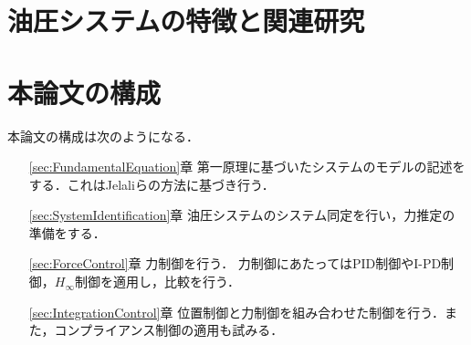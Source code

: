 \section{油圧システムの特徴と関連研究}

\section{本論文の構成}
本論文の構成は次のようになる．
\begin{itemize}
    \item [\ref{sec:FundamentalEquation}章]第一原理に基づいたシステムのモデルの記述をする．これはJelaliらの方法\cite{jelali2012hydraulic}に基づき行う．
    \item [\ref{sec:SystemIdentification}章]油圧システムのシステム同定を行い，力推定の準備をする．
    \item [\ref{sec:ForceControl}章]力制御を行う．
    力制御にあたってはPID制御やI-PD制御，$H_\infty$制御を適用し，比較を行う．
    \item [\ref{sec:IntegrationControl}章] 位置制御と力制御を組み合わせた制御を行う．また，コンプライアンス制御の適用も試みる．
\end{itemize}
